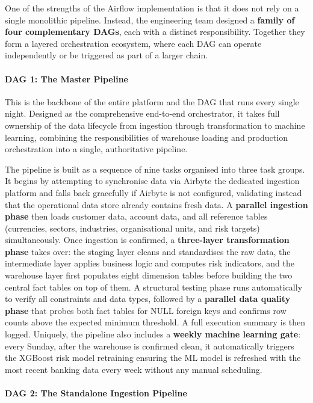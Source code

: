 One of the strengths of the Airflow implementation is that it does not rely on a single
monolithic pipeline. Instead, the engineering team designed a \textbf{family of four
complementary DAGs}, each with a distinct responsibility. Together they form a
layered orchestration ecosystem, where each DAG can operate independently or be
triggered as part of a larger chain.

\paragraph{DAG 1: The Master Pipeline}

This is the backbone of the entire platform and the DAG that runs every single night.
Designed as the comprehensive end-to-end orchestrator, it takes full ownership of the
data lifecycle from ingestion through transformation to machine learning, combining the
responsibilities of warehouse loading and production orchestration into a single,
authoritative pipeline.

The pipeline is built as a sequence of nine tasks organised into three task groups.
It begins by attempting to synchronise data via Airbyte the dedicated ingestion
platform and falls back gracefully if Airbyte is not configured, validating instead
that the operational data store already contains fresh data. A \textbf{parallel
ingestion phase} then loads customer data, account data, and all reference tables
(currencies, sectors, industries, organisational units, and risk targets) simultaneously.
Once ingestion is confirmed, a \textbf{three-layer transformation phase} takes over:
the staging layer cleans and standardises the raw data, the intermediate layer applies
business logic and computes risk indicators, and the warehouse layer first populates
eight dimension tables before building the two central fact tables on top of them.
A structural testing phase runs automatically to verify all constraints and data types,
followed by a \textbf{parallel data quality phase} that probes both fact tables for
NULL foreign keys and confirms row counts above the expected minimum threshold.
A full execution summary is then logged. Uniquely, the pipeline also includes a
\textbf{weekly machine learning gate}: every Sunday, after the warehouse is confirmed
clean, it automatically triggers the XGBoost risk model retraining ensuring the
ML model is refreshed with the most recent banking data every week without any manual
scheduling.

\paragraph{DAG 2: The Standalone Ingestion Pipeline}

